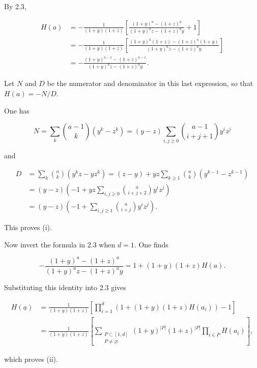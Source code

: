 By 2.3,

\begin{align*}
H(a)
&=-\frac{1}{(1+y)(1+z)}\left[
\frac{(1+y)^a-(1+z)^a}{(1+y)^az-(1+z)^ay}+1\right]\\
&=-\frac{1}{(1+y)(1+z)}\left[
\frac{(1+y)^a(1+z)-(1+z)^a(1+y)}
{(1+y)^az-(1+z)^ay}\right]\\
&=-\frac{(1+y)^{a-1}-(1+z)^{a-1}}
{(1+y)^az-(1+z)^ay}.
\end{align*}

Let $N$ and $D$ be the numerator and denominator in this last expression,
so that $H(a)=-N/D$.


One has

\begin{equation*}
N=\sum_k\binom{a-1}{k}(y^k-z^k)
=(y-z)\sum_{i,j\geq0}\binom{a-1}{i+j+1}y^iz^j
\end{equation*}

and

\begin{align*}
D
&=\sum_k\binom ak(y^kz-yz^k)
=(z-y)+yz\sum_{k\geq1}\binom ak(y^{k-1}-z^{k-1})\\
&=(y-z)\left(-1+yz\sum_{i,j\geq0}
\binom a{i+j+2}y^iz^j\right)\\
&=(y-z)\left(-1+\sum_{i,j\geq1}
\binom a{i+j}y^iz^j\right).
\end{align*}

This proves (i).

Now invert the formula in 2.3 when $d=1$.  One finds

\begin{equation*}
-\frac{(1+y)^a-(1+z)^a}{(1+y)^az-(1+z)^ay}
=1+(1+y)(1+z)H(a).
\end{equation*}

Substituting this identity into 2.3 gives

\begin{align*}
H(\underline a)
&=\frac{1}{(1+y)(1+z)}\left[
\prod_{i=1}^d\left(1+(1+y)(1+z)H(a_i)\right)-1\right]\\
&=\frac{1}{(1+y)(1+z)}\left[
\sum_{\substack{P\subset[1,d]\\P\ne\varnothing}}
(1+y)^{|P|}(1+z)^{|P|}\prod_{i\in P}H(a_i)\right],
\end{align*}

which proves (ii).
